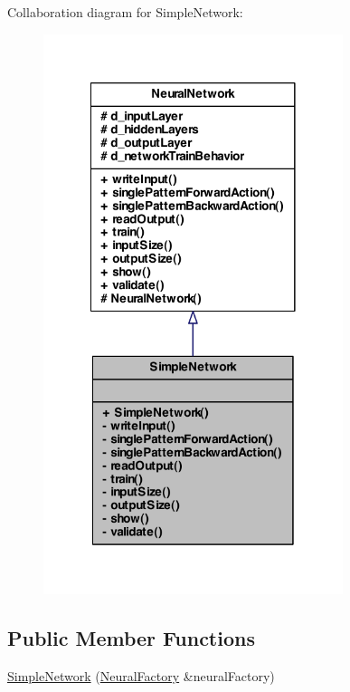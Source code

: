 Collaboration diagram for SimpleNetwork:
\nopagebreak
\begin{figure}[H]
\begin{center}
\leavevmode
\includegraphics[width=248pt]{class_simple_network__coll__graph}
\end{center}
\end{figure}
\subsection*{Public Member Functions}
\begin{DoxyCompactItemize}
\item 
\hyperlink{class_simple_network_a8371fd3be054537889207547e5e53e29}{SimpleNetwork} (\hyperlink{class_neural_factory}{NeuralFactory} \&neuralFactory)
\end{DoxyCompactItemize}
